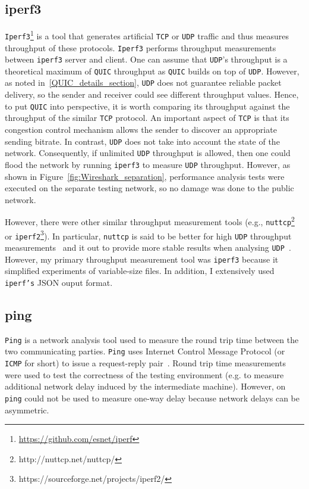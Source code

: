 \documentclass[12pt,a4paper,twoside,openright]{report}
\newcommand\note[2]{{\color{#1}\bf #2}}
\newcommand\simon[1]{\ifcomments{\note{cyan}{SM: #1}}\fi}
\begin{document}
\subsection{iperf3}
\texttt{Iperf3}\footnote{\url{https://github.com/esnet/iperf}} is a tool that generates artificial \texttt{TCP} or \texttt{UDP} traffic and thus measures throughput of these protocols.
\texttt{Iperf3} performs throughput measurements between \texttt{iperf3} server and client.
One can assume that \texttt{UDP}'s throughput is a theoretical maximum of \texttt{QUIC} throughput as \texttt{QUIC} builds on top of \texttt{UDP}.
However, as noted in~\ref{QUIC_details_section}, \texttt{UDP} does not guarantee reliable packet delivery, so the sender and receiver could see different throughput values.
Hence, to put \texttt{QUIC} into perspective, it is worth comparing its throughput against the throughput of the similar \texttt{TCP} protocol.
An important aspect of \texttt{TCP} is that its congestion control mechanism allows the sender to discover an appropriate sending bitrate.
In contrast, \texttt{UDP} does not take into account the state of the network.
Consequently, if unlimited \texttt{UDP} throughput is allowed, then one could flood the network by running \texttt{iperf3} to measure \texttt{UDP} throughput.
However, as shown in Figure~\ref{fig:Wireshark_separation}, performance analysis tests were executed on the separate testing network, so no damage was done to the public network.

However, there were other similar throughput measurement tools (e.g., \texttt{nuttcp}\footnote{http://nuttcp.net/nuttcp/} or \texttt{iperf2}\footnote{https://sourceforge.net/projects/iperf2/}).
In particular, \texttt{nuttcp} is said to be better for high \texttt{UDP} throughput measurements~\cite{network-troubleshooting-tools_nuttcp} and it out to provide more stable results when analysing \texttt{UDP}~\cite{Nuttcp_geant}.
However, my primary throughput measurement tool was \texttt{iperf3} because it simplified experiments of variable-size files.
In addition, I extensively used \texttt{iperf's} JSON ouput format.



\subsection{ping}
\texttt{Ping} is a network analysis tool used to measure the round trip time between the two communicating parties.
\texttt{Ping} uses Internet Control Message Protocol (or \texttt{ICMP} for short) to issue a request-reply pair~\cite{internet-control-message-protocol-icmp}.
Round trip time measurements were used to test the correctness of the testing environment (e.g. to measure additional network delay induced by the intermediate machine).
However, on \texttt{ping} could not be used to measure one-way delay because network delays can be asymmetric.
\end{document}
